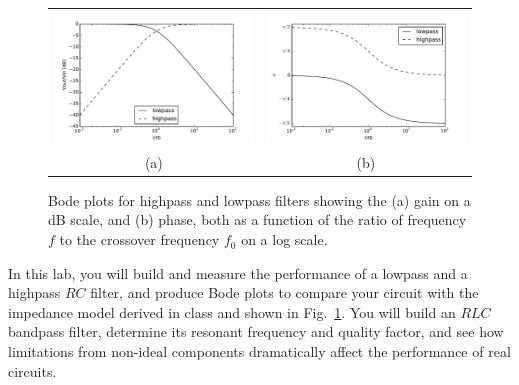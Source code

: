\documentclass[12pt]{article}
\begin{document}
\begin{figure}[htbp]
\begin{center}
\begin{tabular}{cc}
\includegraphics[height=0.22\textheight]{figs/bode.pdf}
&
\includegraphics[height=0.22\textheight]{figs/phase.pdf} \\
(a) & (b) \\
\end{tabular}
\end{center}
\caption{\label{fig:bode} Bode plots for highpass and lowpass filters showing the (a) gain on a dB scale, and (b) phase, both as a function of the ratio of frequency $f$ to the crossover frequency $f_0$ on a log scale.}
\end{figure}

In this lab, you will build and measure the performance of a lowpass and a highpass $RC$ filter, and produce Bode plots to compare your circuit with the impedance model derived in class and shown in Fig.~\ref{fig:bode}.  You will build an $RLC$ bandpass filter, determine its resonant frequency and quality factor, and see how limitations from non-ideal components dramatically affect the performance of real circuits.
\end{document}
